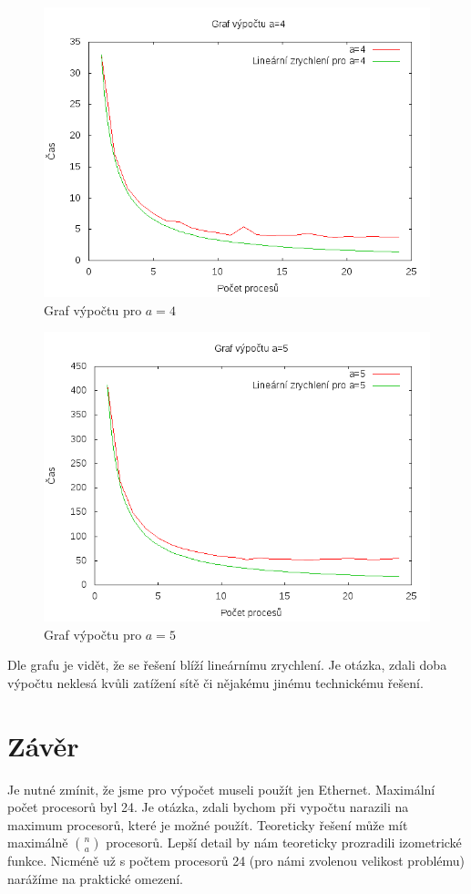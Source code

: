 \documentclass[a4paper,10pt]{report}
\begin{document}
\begin{figure}[H]
  \centering
    \includegraphics[width=1\textwidth]{../data/star_logs/graf4.png}
  \caption{Graf výpočtu pro $a=4$}
  \label{fig:fou}
\end{figure}

\begin{figure}[H]
  \centering
    \includegraphics[width=1\textwidth]{../data/star_logs/graf5.png}
  \caption{Graf výpočtu pro $a=5$}
  \label{fig:fiv}
\end{figure}

Dle grafu je vidět, že se řešení blíží lineárnímu zrychlení. Je otázka, zdali doba výpočtu neklesá kvůli zatížení sítě či nějakému jinému technickému řešení.

\section{Závěr}

Je nutné zmínit, že jsme pro výpočet museli použít jen Ethernet. Maximální počet procesorů byl 24. Je otázka, zdali bychom při vypočtu narazili na maximum procesorů, které je možné použít. Teoreticky řešení může mít maximálně ${n \choose a}$ procesorů. Lepší detail by nám teoreticky prozradili izometrické funkce. Nicméně už s počtem procesorů 24 (pro námi zvolenou velikost problému) narážíme na praktické omezení.
\end{document}
